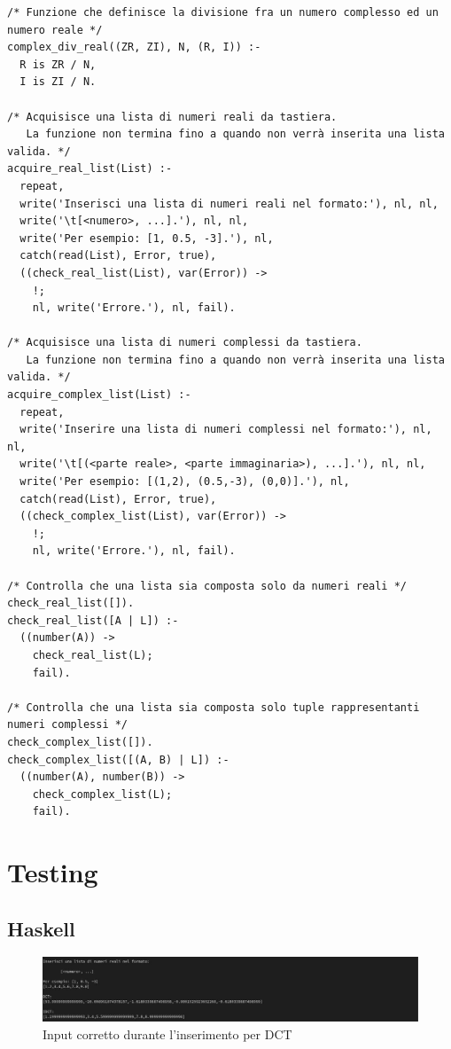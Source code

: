 \documentclass{report}
\begin{document}
{\begin{verbatim}
/* Funzione che definisce la divisione fra un numero complesso ed un numero reale */
complex_div_real((ZR, ZI), N, (R, I)) :- 
  R is ZR / N, 
  I is ZI / N.

/* Acquisisce una lista di numeri reali da tastiera.
   La funzione non termina fino a quando non verrà inserita una lista valida. */
acquire_real_list(List) :-
  repeat,
  write('Inserisci una lista di numeri reali nel formato:'), nl, nl,
  write('\t[<numero>, ...].'), nl, nl,
  write('Per esempio: [1, 0.5, -3].'), nl,
  catch(read(List), Error, true),
  ((check_real_list(List), var(Error)) -> 
    !;
    nl, write('Errore.'), nl, fail).

/* Acquisisce una lista di numeri complessi da tastiera.
   La funzione non termina fino a quando non verrà inserita una lista valida. */
acquire_complex_list(List) :-
  repeat,
  write('Inserire una lista di numeri complessi nel formato:'), nl, nl,
  write('\t[(<parte reale>, <parte immaginaria>), ...].'), nl, nl,
  write('Per esempio: [(1,2), (0.5,-3), (0,0)].'), nl,
  catch(read(List), Error, true),
  ((check_complex_list(List), var(Error)) -> 
    !; 
    nl, write('Errore.'), nl, fail).

/* Controlla che una lista sia composta solo da numeri reali */
check_real_list([]).
check_real_list([A | L]) :- 
  ((number(A)) -> 
    check_real_list(L); 
    fail).

/* Controlla che una lista sia composta solo tuple rappresentanti numeri complessi */
check_complex_list([]).
check_complex_list([(A, B) | L]) :- 
  ((number(A), number(B)) -> 
    check_complex_list(L); 
    fail).
  \end{verbatim}
	}
	\normalsize

	\chapter{Testing}
    \section{Haskell}
    \begin{center}
      \begin{figure}[h!]
        \includegraphics[width=\textwidth]{test_hs_1.jpg}
        \caption{Input corretto durante l'inserimento per DCT}
      \end{figure}
    \end{center}
\end{document}
